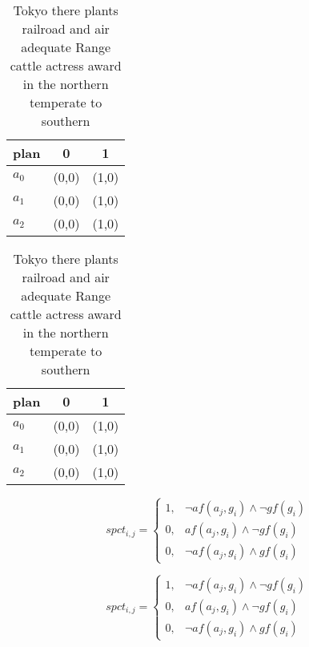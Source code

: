 \documentclass[a4paper]{article}
\begin{document}
\begin{table}
\begin{adjustbox}{width=0.9\columnwidth}
\begin{tabular}{|l|l|l|}
\hline
\textbf{plan} & \multicolumn{1}{c|}{\textbf{0}} & \multicolumn{1}{c|}{\textbf{1}} \\ \hline
\textbf{$a_0$}  & (0,0) & (1,0) \\ \hline
\textbf{$a_1$}  & (0,0) & (1,0) \\ \hline
\textbf{$a_2$}  & (0,0) & (1,0) \\ \hline
\end{tabular}
\end{adjustbox}
\caption{Tokyo there plants railroad and air adequate Range cattle actress award in the northern temperate to southern
}
\end{table}

\begin{table}
\begin{adjustbox}{width=0.9\columnwidth}
\begin{tabular}{|l|l|l|}
\hline
\textbf{plan} & \multicolumn{1}{c|}{\textbf{0}} & \multicolumn{1}{c|}{\textbf{1}} \\ \hline
\textbf{$a_0$}  & (0,0) & (1,0) \\ \hline
\textbf{$a_1$}  & (0,0) & (1,0) \\ \hline
\textbf{$a_2$}  & (0,0) & (1,0) \\ \hline
\end{tabular}
\end{adjustbox}
\caption{Tokyo there plants railroad and air adequate Range cattle actress award in the northern temperate to southern
}
\end{table}

\begin{equation}
spct_{i,j} =
\begin{cases}
1, & \text{$\neg af(a_j,g_i) \wedge \neg gf(g_i)$}\\
0, & \text{$af(a_j,g_i) \wedge \neg gf(g_i)$}\\
0, & \text{$\neg af(a_j,g_i) \wedge gf(g_i)$}
\end{cases}
\end{equation}

\begin{equation}
spct_{i,j} =
\begin{cases}
1, & \text{$\neg af(a_j,g_i) \wedge \neg gf(g_i)$}\\
0, & \text{$af(a_j,g_i) \wedge \neg gf(g_i)$}\\
0, & \text{$\neg af(a_j,g_i) \wedge gf(g_i)$}
\end{cases}
\end{equation}
\end{document}
